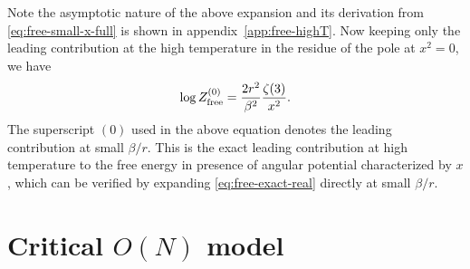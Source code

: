 \documentclass[a4paper,11pt]{article}
\newcommand{\appref}[1]{appendix~\ref{#1}}
\newcommand{\Order}{\mathcal O}
\begin{document}
Note the asymptotic nature of the above expansion and its  derivation from \eqref{eq:free-small-x-full} is shown in \appref{app:free-highT}.
Now keeping only the leading contribution at the high temperature in the residue of the pole at $x^2=0$, we have
\begin{equation}
 \log Z_{\rm free}^{(0)}
 =\frac{2r^2}{\beta^2}\frac{\zeta(3)}{x^2}.
 \label{eq:free-leading-pole}
\end{equation}
The superscript $(0)$ used in the above equation denotes the leading contribution at small $\beta/r $. This is the exact leading contribution at high temperature to the free energy in presence of angular potential characterized by $x$, which can be verified by expanding \eqref{eq:free-exact-real} directly at small $\beta/r$.

\section{Critical $O(N)$ model}
\label{sec:interacting}
\end{document}
